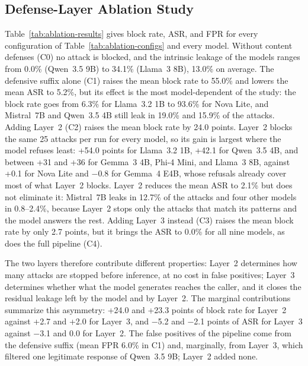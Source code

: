 \subsection{Defense-Layer Ablation Study}
\label{sec:ablation}





Table~\ref{tab:ablation-results} gives block rate, ASR, and FPR for every configuration of Table~\ref{tab:ablation-configs} and every model. Without content defenses (C0) no attack is blocked, and the intrinsic leakage of the models ranges from 0.0\% (Qwen~3.5 9B) to 34.1\% (Llama~3 8B), 13.0\% on average. The defensive suffix alone (C1) raises the mean block rate to 55.0\% and lowers the mean ASR to 5.2\%, but its effect is the most model-dependent of the study: the block rate goes from 6.3\% for Llama~3.2 1B to 93.6\% for Nova Lite, and Mistral~7B and Qwen~3.5 4B still leak in 19.0\% and 15.9\% of the attacks. Adding Layer~2 (C2) raises the mean block rate by 24.0 points. Layer~2 blocks the same 25 attacks per run for every model, so its gain is largest where the model refuses least: +54.0 points for Llama~3.2 1B, +42.1 for Qwen~3.5 4B, and between +31 and +36 for Gemma~3 4B, Phi-4 Mini, and Llama~3 8B, against +0.1 for Nova Lite and $-$0.8 for Gemma~4 E4B, whose refusals already cover most of what Layer~2 blocks. Layer~2 reduces the mean ASR to 2.1\% but does not eliminate it: Mistral~7B leaks in 12.7\% of the attacks and four other models in 0.8--2.4\%, because Layer~2 stops only the attacks that match its patterns and the model answers the rest. Adding Layer~3 instead (C3) raises the mean block rate by only 2.7 points, but it brings the ASR to 0.0\% for all nine models, as does the full pipeline (C4).

The two layers therefore contribute different properties: Layer~2 determines how many attacks are stopped before inference, at no cost in false positives; Layer~3 determines whether what the model generates reaches the caller, and it closes the residual leakage left by the model and by Layer~2. The marginal contributions summarize this asymmetry: +24.0 and +23.3 points of block rate for Layer~2 against +2.7 and +2.0 for Layer~3, and $-$5.2 and $-$2.1 points of ASR for Layer~3 against $-$3.1 and 0.0 for Layer~2. The false positives of the pipeline come from the defensive suffix (mean FPR 6.0\% in C1) and, marginally, from Layer~3, which filtered one legitimate response of Qwen~3.5 9B; Layer~2 added none.

